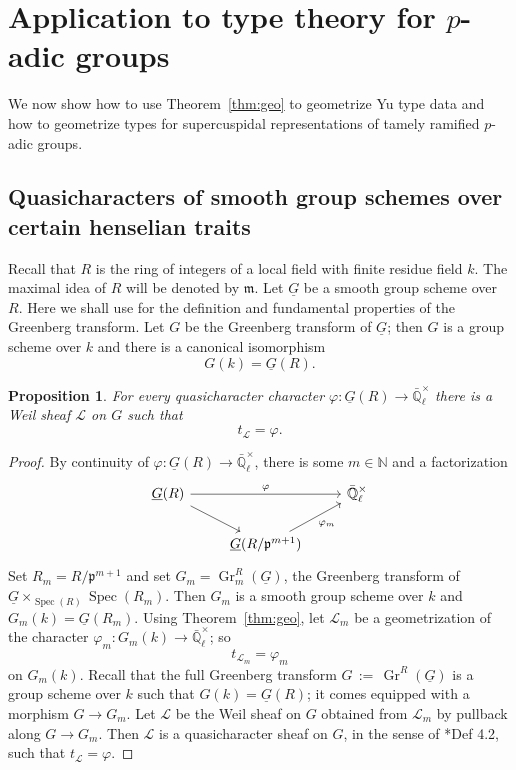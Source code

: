 \documentclass[10pt]{amsart}
\theoremstyle{plain}
\newtheorem{proposition}[theorem]{Proposition}
\theoremstyle{definition}
\newcommand{\NN}{{\mathbb{N}}}
\newcommand{\EE}{\mathbb{\bar Q}_\ell}
\newcommand{\Fq}{k}
\newcommand{\EEx}{\EE^\times}
\DeclareMathOperator{\Gr}{Gr}
\newcommand{\Spec}[1]{{\operatorname{Spec}(#1)}}
\newcommand{\ceq}{{\, :=\, }}
\newcommand{\trFrob}[1]{t_{#1}}
\newcommand{\cs}[1]{{\mathcal{#1}}}
\begin{document}
\section{Application to type theory for \texorpdfstring{$p$}{p}-adic groups}\label{sec:types}

We now show how to use Theorem~\ref{thm:geo} to geometrize Yu type data and how to geometrize types for supercuspidal representations of tamely ramified $p$-adic groups.

\subsection{Quasicharacters of smooth group schemes over certain henselian traits}

Recall that $R$ is the ring of integers of a local field with finite residue field $k$.
The maximal idea of $R$ will be denoted by $\mathfrak{m}$. 
Let $\underline{G}$ be a smooth group scheme over $R$.
Here we shall use  \cite{bertapelle-gonzales:Greenberg} for the definition and fundamental properties of the Greenberg transform.
Let $G$ be the Greenberg transform of $\underline{G}$; then $G$ is a group scheme over $\Fq$ and there is a canonical isomorphism
\[
G(\Fq) = \underline{G}(R).
\]

\begin{proposition}\label{prop:quasicharacters}
For every quasicharacter character $\varphi : \underline{G}(R) \to \EEx$ there is a Weil sheaf $\cs{L}$ on $G$ such that \[\trFrob{\cs{L}} =  \varphi.\] \end{proposition}

\begin{proof}
By continuity of $\varphi : \underline{G}(R) \to \EE^\times$, there is some $m \in \NN$ and a factorization
\[
\begin{tikzcd}
\underline{G}(R) \arrow{rr}{\varphi} \arrow{rd} && \EEx\\
& \underline{G}(R/\mathfrak{p}^{m+1}) \arrow{ru}[swap]{\varphi_m} 
\end{tikzcd}
\] 
Set $R_m = R/\mathfrak{p}^{m+1}$ and
set $G_m = \Gr_m^{R}(\underline{G})$, the Greenberg transform of $\underline{G}\times_{\Spec{R}}\Spec{R_m}$.
Then $G_m$ is a smooth group scheme over $\Fq$ and $G_m(\Fq) = \underline{G}(R_m)$.
Using Theorem~\ref{thm:geo}, let $\cs{L}_m$ be a geometrization of the character $\varphi_m: G_m(\Fq) \to \EEx$; so
\[
\trFrob{\cs{L}_m} = \varphi_m
\]
on $G_m(\Fq)$.
%
Recall that the full Greenberg transform $G \ceq \Gr^{R}(\underline{G})$ is a group scheme over $\Fq$ such that $G(\Fq) = \underline{G}(R)$; it comes equipped with a morphism $G \to G_m$.
Let $\cs{L}$ be the Weil sheaf on $G$ obtained from $\cs{L}_m$ by pullback along $G \to G_m$. 
Then $\cs{L}$ is a quasicharacter sheaf on $G$, in the sense of \cite{cunningham-roe:13a}*{Def 4.2}, such that $\trFrob{\cs{L}} = \varphi$.
\end{proof}
\end{document}
